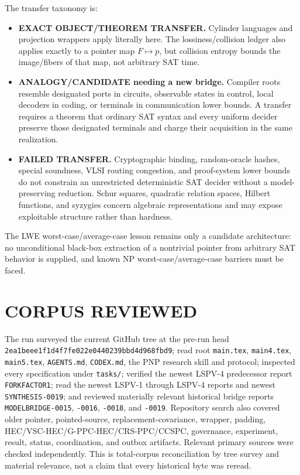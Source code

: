 \documentclass[11pt]{article}
\begin{document}
The transfer taxonomy is:
\begin{itemize}
\item \textbf{EXACT OBJECT/THEOREM TRANSFER.}  Cylinder languages and projection wrappers apply literally here.  The lossiness/collision ledger also applies exactly to a pointer map $F\mapsto p$, but collision entropy bounds the image/fibers of that map, not arbitrary SAT time.
\item \textbf{ANALOGY/CANDIDATE needing a new bridge.}  Compiler roots resemble designated ports in circuits, observable states in control, local decoders in coding, or terminals in communication lower bounds.  A transfer requires a theorem that ordinary SAT syntax and every uniform decider preserve those designated terminals and charge their acquisition in the same realization.
\item \textbf{FAILED TRANSFER.}  Cryptographic binding, random-oracle hashes, special soundness, VLSI routing congestion, and proof-system lower bounds do not constrain an unrestricted deterministic SAT decider without a model-preserving reduction.  Schur squares, quadratic relation spaces, Hilbert functions, and syzygies concern algebraic representations and may expose exploitable structure rather than hardness.
\end{itemize}
The LWE worst-case/average-case lesson remains only a candidate architecture: no unconditional black-box extraction of a nontrivial pointer from arbitrary SAT behavior is supplied, and known NP worst-case/average-case barriers must be faced.

\section{CORPUS REVIEWED}

The run surveyed the current GitHub tree at the pre-run head \texttt{2ea1beee1f1d4f7fe022e0440239bbd4d968fbd9}; read root \texttt{main.tex}, \texttt{main4.tex}, \texttt{main5.tex}, \texttt{AGENTS.md}, \texttt{CODEX.md}, the PNP research skill and protocol; inspected every specification under \texttt{tasks/}; verified the newest LSPV-4 predecessor report \texttt{FORKFACTOR1}; read the newest LSPV-1 through LSPV-4 reports and newest \texttt{SYNTHESIS-0019}; and reviewed materially relevant historical bridge reports \texttt{MODELBRIDGE-0015}, \texttt{-0016}, \texttt{-0018}, and \texttt{-0019}.  Repository search also covered older pointer, pointed-source, replacement-covariance, wrapper, padding, HEC/VSC-HEC/G-PPC-HEC/CRS-PPC/CCSPC, governance, experiment, result, status, coordination, and outbox artifacts.  Relevant primary sources were checked independently.  This is total-corpus reconciliation by tree survey and material relevance, not a claim that every historical byte was reread.
\end{document}
